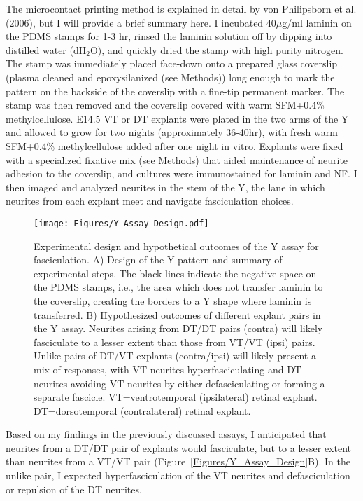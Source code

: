 The microcontact printing method is explained in detail by von Philipsborn et al. (2006), but I will provide a brief summary here.
I incubated 40$\mu$g/ml laminin on the PDMS stamps for 1-3 hr, rinsed the laminin solution off by dipping into distilled water (dH$_2$O), and quickly dried the stamp with high purity nitrogen.
The stamp was immediately placed face-down onto a prepared glass coverslip (plasma cleaned and epoxysilanized (see Methods)) long enough to mark the pattern on the backside of the coverslip with a fine-tip permanent marker.
The stamp was then removed and the coverslip covered with warm SFM+0.4\% methylcellulose.
E14.5 VT or DT explants were plated in the two arms of the Y and allowed to grow for two nights (approximately 36-40hr), with fresh warm SFM+0.4\% methylcellulose added after one night in vitro.
Explants were fixed with a specialized fixative mix (see Methods) that aided maintenance of neurite adhesion to the coverslip, and cultures were immunostained for laminin and NF.
I then imaged and analyzed neurites in the stem of the Y, the lane in which neurites from each explant meet and navigate fasciculation choices.
\begin{figure}[hbtp]
    \begin{center}
        \texttt{[image: Figures/Y\_Assay\_Design.pdf]}
        \caption[Experimental design and hypothetical outcomes of the Y assay for fasciculation.]
        {Experimental design and hypothetical outcomes of the Y assay for fasciculation.
        A) Design of the Y pattern and summary of experimental steps.
        The black lines indicate the negative space on the PDMS stamps, i.e., the area which does not transfer laminin to the coverslip, creating the borders to a Y shape where laminin is transferred.
        B) Hypothesized outcomes of different explant pairs in the Y assay.
        Neurites arising from DT/DT pairs (contra) will likely fasciculate to a lesser extent than those from VT/VT (ipsi) pairs.
        Unlike pairs of DT/VT explants (contra/ipsi) will likely present a mix of responses, with VT neurites hyperfasciculating and DT neurites avoiding VT neurites by either defasciculating or forming a separate fascicle.
        VT=ventrotemporal (ipsilateral) retinal explant.
        DT=dorsotemporal (contralateral) retinal explant.
        }
        \label{Figures/YAssayDesign}
    \end{center}
\end{figure}
Based on my findings in the previously discussed assays, I anticipated that neurites from a DT/DT pair of explants would fasciculate, but to a lesser extent than neurites from a VT/VT pair (Figure~\ref{Figures/Y_Assay_Design}B).
In the unlike pair, I expected hyperfasciculation of the VT neurites and defasciculation or repulsion of the DT neurites.

